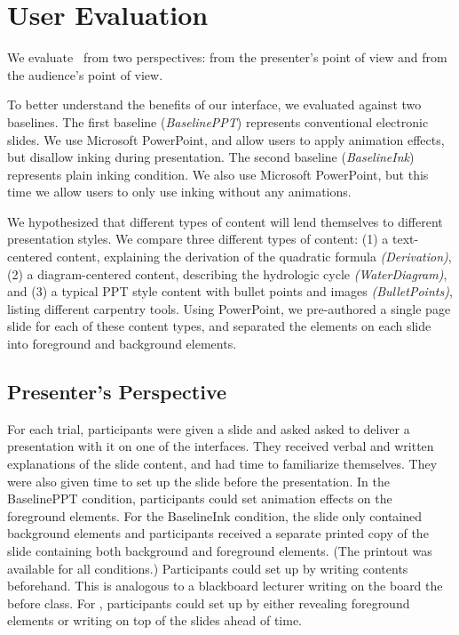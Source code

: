 \section{User Evaluation}

We evaluate \interface\ from two perspectives: from the presenter's point of view and from the audience's point of view. 


To better understand the benefits of our interface, we evaluated \interface against two baselines. The first baseline (\textit{BaselinePPT}) represents conventional electronic slides. We use Microsoft PowerPoint, and allow users to apply animation effects, but disallow inking during presentation. The second baseline (\textit{BaselineInk}) represents plain inking condition. We also use Microsoft PowerPoint, but this time we allow users to only use inking without any animations. 

We hypothesized that different types of content will lend themselves to different presentation styles. We compare three different types of content: (1) a text-centered content, explaining the derivation of the quadratic formula \textit{(Derivation)}, (2) a diagram-centered content, describing the hydrologic cycle  \textit{(WaterDiagram)}, and (3) a typical PPT style content with bullet points and images  \textit{(BulletPoints)}, listing different carpentry tools. Using PowerPoint, we pre-authored a single page slide for each of these content types, and separated the elements on each slide into foreground and background elements.  

\subsection{Presenter's Perspective}
For each trial, participants were given a slide and asked asked to deliver a presentation with it on one of the interfaces. They received verbal and written explanations of the slide content, and had time to familiarize themselves. They were also given time to set up the slide before the presentation. In the BaselinePPT condition, participants could set animation effects on the foreground elements. For the BaselineInk condition, the slide only contained background elements  and participants received a separate printed copy of the slide containing both background and foreground elements. (The printout was available for all conditions.) Participants could set up by writing contents beforehand. This is analogous to a blackboard lecturer writing on the board the before class. For \interface, participants could set up by either revealing foreground elements or writing on top of the slides ahead of time. 

